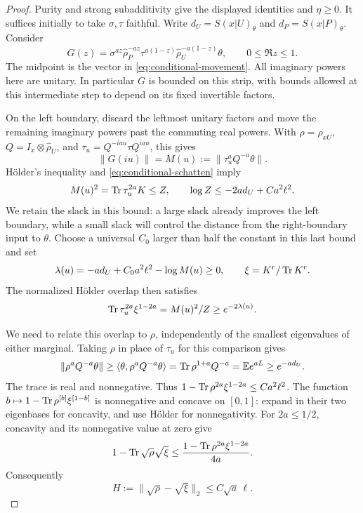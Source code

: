 \begin{proof}
Purity and strong subadditivity give the displayed identities and
$\eta\ge0$.  It suffices initially to take $\sigma,\tau$ faithful.
Write $d_U=S(x|U)_\theta$ and $d_P=S(x|P)_\theta$.  Consider
\[
 G(z)=\sigma^{az}\widehat\rho_P^{-az}
       \tau^{a(1-z)}\widehat\rho_U^{-a(1-z)}\theta,
 \qquad 0\le\Re z\le1.
\]
The midpoint is the vector in \eqref{eq:conditional-movement}.
All imaginary powers here are unitary.  In particular $G$ is bounded
on this strip, with bounds allowed at this intermediate step to depend
on its fixed invertible factors.

On the left boundary, discard the leftmost unitary factors and move
the remaining imaginary powers past the commuting real powers.  With
$\rho=\rho_{xU}$, $Q=I_x\otimes\widehat\rho_U$, and
$\tau_u=Q^{-iau}\tau Q^{iau}$, this gives
\[
 \|G(iu)\|=M(u):=\|\tau_u^aQ^{-a}\theta\|.
\]
H\"older's inequality and \eqref{eq:conditional-schatten} imply
\[
 M(u)^2=\operatorname{Tr}\tau_u^{2a}K\le Z,
 \qquad \log Z\le-2ad_U+C a^2\ell^2.
\]
We retain the slack in this bound: a large slack already improves
the left boundary, while a small slack will control the distance from
the right-boundary input to $\theta$.  Choose a universal $C_0$ larger than half
the constant in this last bound and set
\begin{equation}\label{eq:conditional-slack}
 \lambda(u)=-ad_U+C_0a^2\ell^2-\log M(u)\ge0,
 \qquad \xi=K^r/\operatorname{Tr} K^r.
\end{equation}
The normalized H\"older overlap then satisfies
\begin{equation}\label{eq:conditional-overlap}
 \operatorname{Tr}\tau_u^{2a}\xi^{1-2a}=M(u)^2/Z\ge e^{-2\lambda(u)}.
\end{equation}

We need to relate this overlap to $\rho$, independently of the
smallest eigenvalues of either marginal.  Taking $\rho$ in place of
$\tau_u$ for this comparison gives
\[
 \|\rho^aQ^{-a}\theta\|
 \ge\langle\theta,\rho^aQ^{-a}\theta\rangle
 =\operatorname{Tr}\rho^{1+a}Q^{-a}
 =\mathbb E e^{aL}\ge e^{-ad_U}.
\]
The trace is real and nonnegative.  Thus
$1-\operatorname{Tr}\rho^{2a}\xi^{1-2a}\le C a^2\ell^2$.
The function
$b\mapsto1-\operatorname{Tr}\rho^{[b]}\xi^{[1-b]}$ is nonnegative and concave
on $[0,1]$: expand in their two eigenbases for concavity, and use
H\"older for nonnegativity.  For $2a\le1/2$, concavity and its
nonnegative value at zero give
\[
 1-\operatorname{Tr}\sqrt\rho\sqrt\xi
 \le \frac{1-\operatorname{Tr}\rho^{2a}\xi^{1-2a}}{4a}.
\]
Consequently
\begin{equation}\label{eq:conditional-hellinger}
 H:=\|\sqrt\rho-\sqrt\xi\|_2\le C\sqrt a\,\ell.
\end{equation}


\end{proof}
